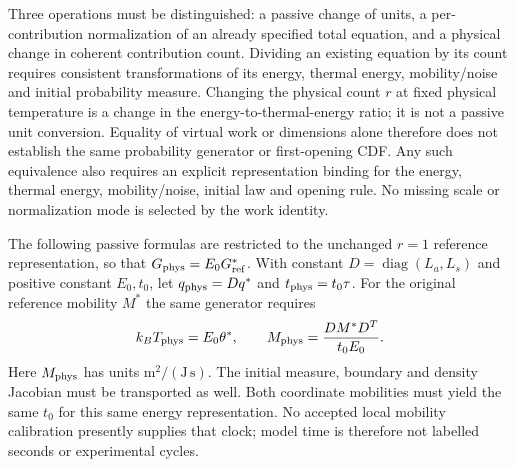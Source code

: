 \documentclass[11pt]{article}
\begin{document}
Three operations must be distinguished: a passive change of units, a
per-contribution normalization of an already specified total equation, and
a physical change in coherent contribution count.
Dividing an existing equation by its count requires consistent transformations
of its energy, thermal energy, mobility/noise and initial probability measure.
Changing the physical count $r$ at fixed physical temperature is a change
in the energy-to-thermal-energy ratio; it is not a passive unit conversion.
Equality of virtual work or dimensions alone therefore does not establish
the same probability generator or first-opening CDF. Any such equivalence
also requires an explicit representation binding for the energy, thermal
energy, mobility/noise, initial law and opening rule. No missing scale or
normalization mode is selected by the work identity.

The following passive formulas are restricted to the unchanged $r=1$
reference representation, so that $G_{\rm phys}=E_0G_{\rm ref}^*$.
With constant $D=\operatorname{diag}(L_a,L_s)$ and positive constant
$E_0,t_0$, let $q_{\rm phys}=Dq^*$ and $t_{\rm phys}=t_0\tau$.
For the original reference mobility $M^*$ the same generator requires
\begin{equation}
 k_BT_{\rm phys}=E_0\theta^*,\qquad
 M_{\rm phys}=\frac{DM^*D^T}{t_0E_0}.
\end{equation}
Here $M_{\rm phys}$ has units $\mathrm{m^2/(J\,s)}$.
The initial measure, boundary and density Jacobian must be transported as well.
Both coordinate mobilities must yield the same $t_0$ for this same energy
representation. No accepted local mobility calibration presently supplies
that clock; model time is therefore not labelled seconds or experimental cycles.
\end{document}
